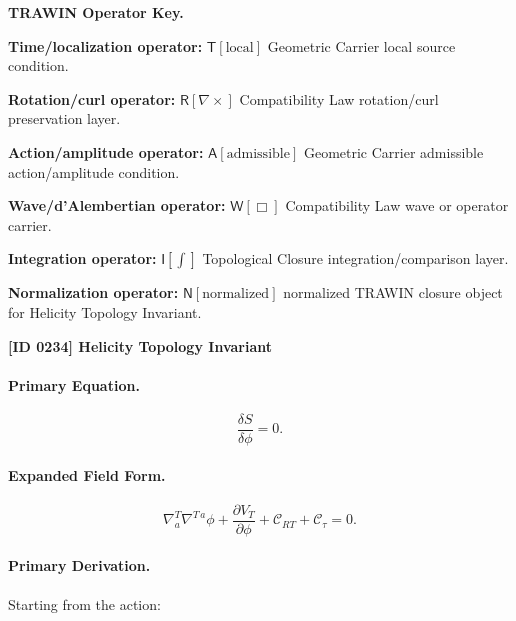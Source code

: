 \par\vspace{0.45\baselineskip}
\noindent\begin{minipage}[t]{\linewidth}
\begingroup
\small
\raggedright
\textbf{TRAWIN Operator Key.}\par
\noindent\textbf{Time/localization operator:} $\mathsf{T}\!\left[\mathrm{local}\right]$ Geometric Carrier local source condition.\par
\noindent\textbf{Rotation/curl operator:} $\mathsf{R}\!\left[\nabla\times\right]$ Compatibility Law rotation/curl preservation layer.\par
\noindent\textbf{Action/amplitude operator:} $\mathsf{A}\!\left[\mathrm{admissible}\right]$ Geometric Carrier admissible action/amplitude condition.\par
\noindent\textbf{Wave/d'Alembertian operator:} $\mathsf{W}\!\left[\Box\right]$ Compatibility Law wave or operator carrier.\par
\noindent\textbf{Integration operator:} $\mathsf{I}\!\left[\int\right]$ Topological Closure integration/comparison layer.\par
\noindent\textbf{Normalization operator:} $\mathsf{N}\!\left[\mathrm{normalized}\right]$ normalized TRAWIN closure object for Helicity Topology Invariant.\par
\endgroup
\end{minipage}

\clearpage
\noindent\textbf{[ID 0234] Helicity Topology Invariant}\par
\vspace{0.35em}
\paragraph{Primary Equation.}
\begin{equation}
\frac{\delta S}{\delta \phi}=0 .
\end{equation}

\paragraph{Expanded Field Form.}
\begin{equation}
\nabla^T_a\nabla^{T\,a}\phi
+
\frac{\partial V_T}{\partial \phi}
+
\mathcal{C}_{RT}
+
\mathcal{C}_{\tau}
=
0 .
\end{equation}

\paragraph{Primary Derivation.}
Starting from the action:

